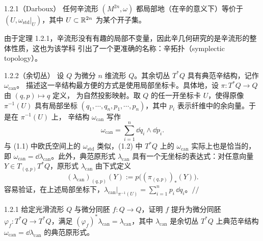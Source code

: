 \begin{wthm}{1.2.1}（Darboux）
任何辛流形 $(M^{2n},\omega)$ 都局部地（在辛的意义下）等价于 $(U,\omega_{\mathrm{std}}|_U)$，其中
$U\subset\mathbb{R}^{2n}$ 为某个开子集。
\end{wthm}

由于定理 1.2.1，辛流形没有有趣的局部不变量，因此辛几何研究的是辛流形的整体性质，这也为该学科
引出了一个更准确的名称：辛拓扑（symplectic topology）。

\begin{wexam}{1.2.2}（余切丛）
设 $Q$ 为微分 $n$ 维流形 $Q$。其余切丛 $T^*Q$ 具有典范辛结构，记作 $\omega_{\mathrm{can}}$。
描述这一辛结构最方便的方式是使用局部坐标卡。具体地，设 $\pi:T^*Q\to Q$ 由 $(q,p)\mapsto q$ 定义，
为自然投影映射。取 $Q$ 的任一开坐标卡 $U$，使得原像 $\pi^{-1}(U)$ 具有局部坐标
$(q_1,\cdots,q_n,p_1,\cdots,p_n)$，其中 $p_i$ 表示纤维中的余向量。于是在 $\pi^{-1}(U)$ 上，
辛结构 $\omega_{\mathrm{can}}$ 写作
\begin{equation}
  \omega_{\mathrm{can}}=\sum_{i=1}^{n}\dd q_i\wedge\dd p_i .
  \tag{1.2}
\end{equation}
与 (1.1) 中欧氏空间上的 $\omega_{\mathrm{std}}$ 类似，(1.2) 中 $T^*Q$ 上的 $\omega_{\mathrm{can}}$
实际上也是恰当的，即 $\omega_{\mathrm{can}}=\dd\lambda_{\mathrm{can}}$。此外，典范原形式
$\lambda_{\mathrm{can}}$ 具有一个无坐标的表达式：对任意向量 $Y\in T_{(q,p)}T^*Q$，原形式
$\lambda_{\mathrm{can}}$ 由下式定义
\begin{equation}
  (\lambda_{\mathrm{can}})_{(q,p)}(Y):=p\big((\pi_{(q,p)})_*(Y)\big).
  \tag{1.3}
\end{equation}
容易验证，在上述局部坐标下，$\lambda_{\mathrm{can}}|_{\pi^{-1}(U)}=\sum_{i=1}^{n}p_i\,\dd q_i$。\hfill$//$
\end{wexam}

\begin{wexer}{1.2.1}
给定光滑流形 $Q$ 与微分同胚 $f:Q\to Q$，证明 $f$ 提升为微分同胚 $\varphi_f:T^*Q\to T^*Q$，满足
$(\varphi_f)^*\lambda_{\mathrm{can}}=\lambda_{\mathrm{can}}$，其中 $\lambda_{\mathrm{can}}$ 是余切丛
$T^*Q$ 上典范辛结构 $\omega_{\mathrm{can}}=\dd\lambda_{\mathrm{can}}$ 的典范原形式。
\end{wexer}

